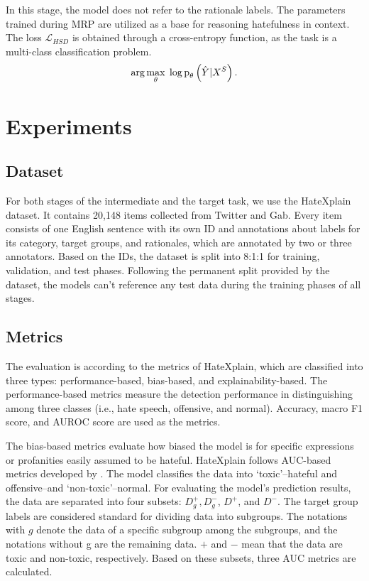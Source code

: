 \documentclass[11pt]{article}
\newcommand{\prt}[1]{\text{p}_\theta\left( #1\right)}
\begin{document}
In this stage, the model does not refer to the rationale labels. The parameters trained during MRP are utilized as a base for reasoning hatefulness in context. The loss $\mathcal{L}_{HSD}$ is obtained through a cross-entropy function, as the task is a multi-class classification problem.
\begin{equation}
\begin{split}
    \displaystyle
    \arg \max_{\theta} \hspace{1mm} \log \prt{\hat{Y} \vert X^S}.
\end{split}
\label{eq_hsd_obj}
\end{equation}


\section{Experiments}
\subsection{Dataset}
For both stages of the intermediate and the target task, we use the HateXplain dataset. It contains 20,148 items collected from Twitter and Gab. Every item consists of one English sentence with its own ID and annotations about labels for its category, target groups, and rationales, which are annotated by two or three annotators. Based on the IDs, the dataset is split into 8:1:1 for training, validation, and test phases. Following the permanent split provided by the dataset, the models can't reference any test data during the training phases of all stages.


\subsection{Metrics}



The evaluation is according to the metrics of HateXplain, which are classified into three types: performance-based, bias-based, and explainability-based. The performance-based metrics measure the detection performance in distinguishing among three classes (i.e., hate speech, offensive, and normal). Accuracy, macro F1 score, and AUROC score are used as the metrics.

The bias-based metrics evaluate how biased the model is for specific expressions or profanities easily assumed to be hateful. HateXplain follows AUC-based metrics developed by \citet{borkan2019nuanced}. The model classifies the data into ‘toxic’--hateful and offensive--and ‘non-toxic’--normal. For evaluating the model’s prediction results, the data are separated into four subsets: $D_{g}^{+}, D_{g}^{-}$, $D^{+}$, and $D^{-}$. The target group labels are considered standard for dividing data into subgroups. The notations with $g$ denote the data of a specific subgroup among the subgroups, and the notations without g are the remaining data. $+$ and $-$ mean that the data are toxic and non-toxic, respectively. Based on these subsets, three AUC metrics are calculated.
\end{document}

